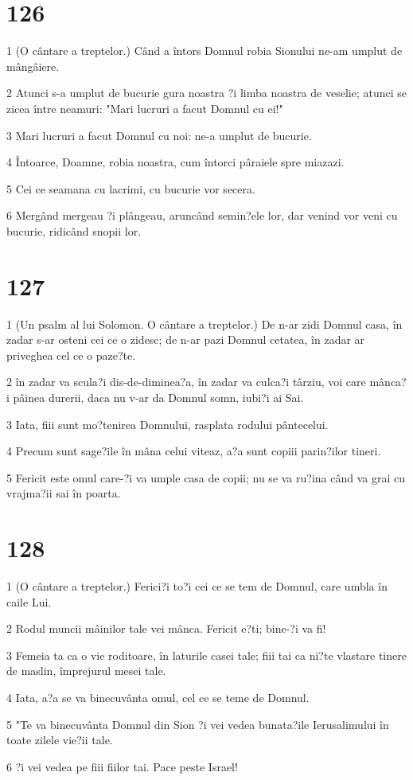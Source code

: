 \chapter{126}

\par 1 (O cântare a treptelor.) Când a întors Domnul robia Sionului ne-am umplut de mângâiere.
\par 2 Atunci s-a umplut de bucurie gura noastra ?i limba noastra de veselie; atunci se zicea între neamuri: "Mari lucruri a facut Domnul cu ei!"
\par 3 Mari lucruri a facut Domnul cu noi: ne-a umplut de bucurie.
\par 4 Întoarce, Doamne, robia noastra, cum întorci pâraiele spre miazazi.
\par 5 Cei ce seamana cu lacrimi, cu bucurie vor secera.
\par 6 Mergând mergeau ?i plângeau, aruncând semin?ele lor, dar venind vor veni cu bucurie, ridicând snopii lor.

\chapter{127}

\par 1 (Un psalm al lui Solomon. O cântare a treptelor.) De n-ar zidi Domnul casa, în zadar s-ar osteni cei ce o zidesc; de n-ar pazi Domnul cetatea, în zadar ar priveghea cel ce o paze?te.
\par 2 în zadar va scula?i dis-de-diminea?a, în zadar va culca?i târziu, voi care mânca?i pâinea durerii, daca nu v-ar da Domnul somn, iubi?i ai Sai.
\par 3 Iata, fiii sunt mo?tenirea Domnului, rasplata rodului pântecelui.
\par 4 Precum sunt sage?ile în mâna celui viteaz, a?a sunt copiii parin?ilor tineri.
\par 5 Fericit este omul care-?i va umple casa de copii; nu se va ru?ina când va grai cu vrajma?ii sai în poarta.

\chapter{128}

\par 1 (O cântare a treptelor.) Ferici?i to?i cei ce se tem de Domnul, care umbla în caile Lui.
\par 2 Rodul muncii mâinilor tale vei mânca. Fericit e?ti; bine-?i va fi!
\par 3 Femeia ta ca o vie roditoare, în laturile casei tale; fiii tai ca ni?te vlastare tinere de maslin, împrejurul mesei tale.
\par 4 Iata, a?a se va binecuvânta omul, cel ce se teme de Domnul.
\par 5 "Te va binecuvânta Domnul din Sion ?i vei vedea bunata?ile Ierusalimului în toate zilele vie?ii tale.
\par 6 ?i vei vedea pe fiii fiilor tai. Pace peste Israel!

